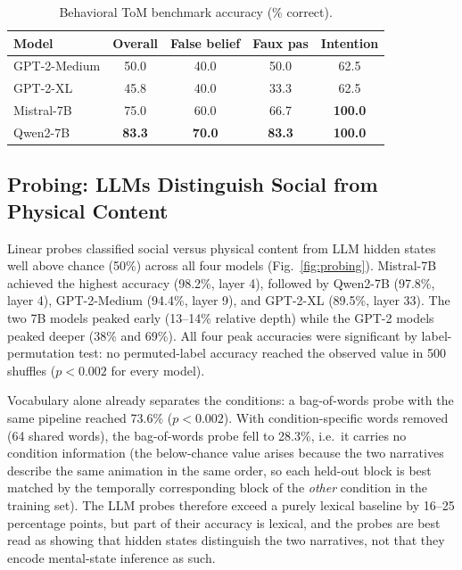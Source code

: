 \documentclass[conference]{IEEEtran}
\begin{document}
\begin{table}[t]
\centering
\caption{Behavioral ToM benchmark accuracy (\% correct).}
\label{tab:behavioral}
\vskip 0.05in
\begin{tabular}{lcccc}
\toprule
Model & Overall & False belief & Faux pas & Intention \\
\midrule
GPT-2-Medium & 50.0 & 40.0 & 50.0 & 62.5 \\
GPT-2-XL     & 45.8 & 40.0 & 33.3 & 62.5 \\
Mistral-7B   & 75.0 & 60.0 & 66.7 & \textbf{100.0} \\
Qwen2-7B     & \textbf{83.3} & \textbf{70.0} & \textbf{83.3} & \textbf{100.0} \\
\bottomrule
\end{tabular}
\end{table}

\subsection{Probing: LLMs Distinguish Social from Physical Content}

Linear probes classified social versus physical content from LLM hidden states well above chance (50\%) across all four models (Fig.~\ref{fig:probing}). Mistral-7B achieved the highest accuracy (98.2\%, layer 4), followed by Qwen2-7B (97.8\%, layer 4), GPT-2-Medium (94.4\%, layer 9), and GPT-2-XL (89.5\%, layer 33). The two 7B models peaked early (13--14\% relative depth) while the GPT-2 models peaked deeper (38\% and 69\%). All four peak accuracies were significant by label-permutation test: no permuted-label accuracy reached the observed value in 500 shuffles ($p < 0.002$ for every model).

Vocabulary alone already separates the conditions: a bag-of-words probe with the same pipeline reached 73.6\% ($p < 0.002$). With condition-specific words removed (64 shared words), the bag-of-words probe fell to 28.3\%, i.e.\ it carries no condition information (the below-chance value arises because the two narratives describe the same animation in the same order, so each held-out block is best matched by the temporally corresponding block of the \emph{other} condition in the training set). The LLM probes therefore exceed a purely lexical baseline by 16--25 percentage points, but part of their accuracy is lexical, and the probes are best read as showing that hidden states distinguish the two narratives, not that they encode mental-state inference as such.
\end{document}
